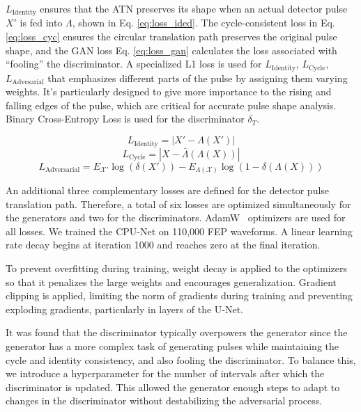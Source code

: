 $L_{\mathrm{Identity}}$ ensures that the ATN preserves its shape when an actual detector pulse $X'$ is fed into $\Lambda$, shown in Eq. \ref{eq:loss_ided}. The cycle-consistent loss in Eq. \ref{eq:loss_cyc} ensures the circular translation path preserves the original pulse shape, and the GAN loss Eq. \ref{eq:loss_gan} calculates the loss associated with ``fooling'' the discriminator. A specialized L1 loss is used for $L_{\mathrm{Identity}}$, $L_{\mathrm{Cycle}}$, $L_{\mathrm{Advesarial}}$ that emphasizes different parts of the pulse by assigning them varying weights. It's particularly designed to give more importance to the rising and falling edges of the pulse, which are critical for accurate pulse shape analysis. Binary Cross-Entropy Loss is used for the discriminator $\delta_{T}$.

\begin{equation}\label{eq:loss_ided}
    L_{\mathrm{Identity}} = |X' - \Lambda(X')|
\end{equation}
\begin{equation}\label{eq:loss_cyc}
    L_{\mathrm{Cycle}} = |X - \bar{\Lambda}(\Lambda(X))|
\end{equation}
\begin{equation}\label{eq:loss_gan}
    L_{\mathrm{Adversarial}} = E_{\mathcal{X'}}\log(\delta(X')) - E_{\Lambda(\mathcal{X})}\log(1 - \delta(\Lambda(X)))
\end{equation}

An additional three complementary losses are defined for the detector pulse translation path. Therefore, a total of six losses are optimized simultaneously for the generators and two for the discriminators. AdamW~\cite{adam_w_paper} optimizers are used for all losses. We trained the CPU-Net on 110,000 FEP waveforms. A linear learning rate decay begins at iteration 1000 and reaches zero at the final iteration.

To prevent overfitting during training, weight decay is applied to the optimizers so that it penalizes the large weights and encourages generalization. Gradient clipping is applied, limiting the norm of gradients during training and preventing exploding gradients, particularly in layers of the U-Net.

It was found that the discriminator typically overpowers the generator since the generator has a more complex task of generating pulses while maintaining the cycle and identity consistency, and also fooling the discriminator. To balance this, we introduce a hyperparameter for the number of intervals after which the discriminator is updated. This allowed the generator enough steps to adapt to changes in the discriminator without destabilizing the adversarial process.


